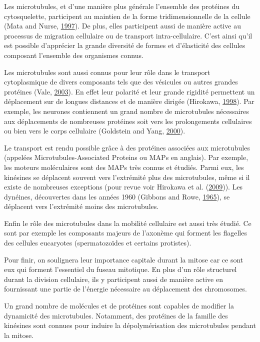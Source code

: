 \documentclass[12pt,a4paper,twoside,openright]{book}
\begin{document}
Les microtubules, et d'une manière plus générale l'ensemble des
protéines du cytosquelette, participent au maintien de la forme
tridimensionnelle de la cellule (Mata and Nurse,
\protect\hyperlink{ref-Mata1997}{1997}). De plus, elles participent
aussi de manière active au processus de migration cellulaire ou de
transport intra-cellulaire. C'est ainsi qu'il est possible d'apprécier
la grande diversité de formes et d'élasticité des cellules composant
l'ensemble des organismes connus.

Les microtubules sont aussi connus pour leur rôle dans le transport
cytoplasmique de divers composants tels que des vésicules ou autres
grandes protéines (Vale, \protect\hyperlink{ref-Vale2003}{2003}). En
effet leur polarité et leur grande rigidité permettent un déplacement
sur de longues distances et de manière dirigée (Hirokawa,
\protect\hyperlink{ref-Hirokawa1998}{1998}). Par exemple, les neurones
contiennent un grand nombre de microtubules nécessaires aux déplacements
de nombreuses protéines soit vers les prolongements cellulaires ou bien
vers le corps cellulaire (Goldstein and Yang,
\protect\hyperlink{ref-Goldstein2000}{2000}).

Le transport est rendu possible grâce à des protéines associées aux
microtubules (appelées Microtubules-Associated Proteins ou MAPs en
anglais). Par exemple, les moteurs moléculaires sont des MAPs très
connus et étudiés. Parmi eux, les kinésines se déplacent souvent vers
l'extrémité plus des microtubules, même si il existe de nombreuses
exceptions (pour revue voir Hirokawa et al.
(\protect\hyperlink{ref-Hirokawa2009}{2009})). Les dynéines, découvertes
dans les années 1960 (Gibbons and Rowe,
\protect\hyperlink{ref-Gibbons1965}{1965}), se déplacent vers
l'extrémité moins des microtubules.

Enfin le rôle des microtubules dans la mobilité cellulaire est aussi
très étudié. Ce sont par exemple les composants majeurs de l'axonème qui
forment les flagelles des cellules eucaryotes (spermatozoïdes et
certains protistes).

Pour finir, on soulignera leur importance capitale durant la mitose car
ce sont eux qui forment l'essentiel du fuseau mitotique. En plus d'un
rôle structurel durant la division cellulaire, ils y participent aussi
de manière active en fournissant une partie de l'énergie nécessaire au
déplacement des chromosomes.

Un grand nombre de molécules et de protéines sont capables de modifier
la dynamicité des microtubules. Notamment, des protéines de la famille
des kinésines sont connues pour induire la dépolymérisation des
microtubules pendant la mitose.
\end{document}
